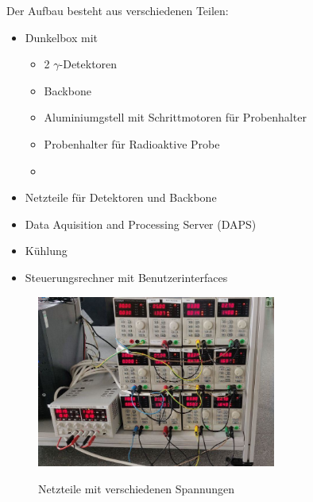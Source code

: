\documentclass[12pt,twoside,a4paper]{scrartcl}
\begin{document}
	Der Aufbau besteht aus verschiedenen Teilen:
	\begin{itemize}
		\item Dunkelbox mit
		\begin{itemize}
			\item 2 $\gamma$-Detektoren
			\item Backbone
			\item Aluminiumgstell mit Schrittmotoren für Probenhalter
			\item Probenhalter für Radioaktive Probe
			\item
		\end{itemize}
		\item Netzteile für Detektoren und Backbone
		\item Data Aquisition and Processing Server (DAPS)
		\item Kühlung
		\item Steuerungsrechner mit Benutzerinterfaces
	\end{itemize}

	\begin{figure}[H]
		\centering
		\includegraphics[width = 0.7\textwidth]{Pictures/Netzteile.jpg}
		\label{Aufbau::Netzteile}
		\caption{Netzteile mit verschiedenen Spannungen}

	\end{figure}
\end{document}
